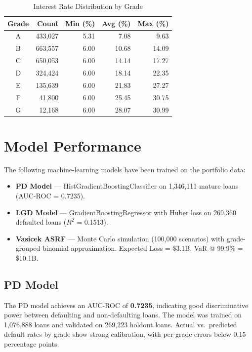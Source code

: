 \documentclass[11pt, a4paper]{article}
\begin{document}
\begin{table}[H]
\centering
\caption{Interest Rate Distribution by Grade}
\begin{tabular}{c r r r r}
\toprule
\textbf{Grade} & \textbf{Count} & \textbf{Min (\%)} & \textbf{Avg (\%)} & \textbf{Max (\%)} \\
\midrule
A & 433,027 & 5.31 & 7.08 & 9.63 \\
B & 663,557 & 6.00 & 10.68 & 14.09 \\
C & 650,053 & 6.00 & 14.14 & 17.27 \\
D & 324,424 & 6.00 & 18.14 & 22.35 \\
E & 135,639 & 6.00 & 21.83 & 27.27 \\
F & 41,800 & 6.00 & 25.45 & 30.75 \\
G & 12,168 & 6.00 & 28.07 & 30.99 \\
\bottomrule
\end{tabular}
\label{tab:rates}
\end{table}

\section{Model Performance}
\label{sec:models}

The following machine-learning models have been trained on the portfolio data:

\begin{itemize}
    \item \textbf{PD Model} --- HistGradientBoostingClassifier on 1,346,111 mature loans
          (AUC-ROC = 0.7235).
    \item \textbf{LGD Model} --- GradientBoostingRegressor with Huber loss on 269,360
          defaulted loans ($R^{2}$ = 0.1513).
    \item \textbf{Vasicek ASRF} --- Monte Carlo simulation (100,000 scenarios) with
          grade-grouped binomial approximation.  Expected Loss = \$3.1B,
          VaR @ 99.9\% = \$10.1B.
\end{itemize}

\subsection{PD Model}

The PD model achieves an AUC-ROC of \textbf{0.7235}, indicating good discriminative power
between defaulting and non-defaulting loans.  The model was trained on 1,076,888 loans
and validated on 269,223 holdout loans.  Actual vs.\ predicted default rates by grade show
strong calibration, with per-grade errors below 0.15 percentage points.
\end{document}
